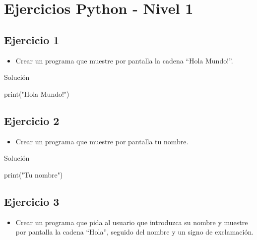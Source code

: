 \documentclass[
  a4paper,
  DIV=11,
  numbers=noendperiod,
  onepage,
  openany]{scrreprt}
\newenvironment{Shaded}{\begin{snugshade}}{\end{snugshade}}
\newcommand{\BuiltInTok}[1]{\textcolor[rgb]{0.00,0.23,0.31}{#1}}
\newcommand{\NormalTok}[1]{\textcolor[rgb]{0.00,0.23,0.31}{#1}}
\newcommand{\StringTok}[1]{\textcolor[rgb]{0.13,0.47,0.30}{#1}}
\providecommand{\tightlist}{%
  \setlength{\itemsep}{0pt}\setlength{\parskip}{0pt}}\usepackage{longtable,booktabs,array}
\begin{document}
\chapter{Ejercicios Python - Nivel 1}\label{ejercicios-python---nivel-1}

\section{Ejercicio 1}\label{ejercicio-1-2}

\begin{itemize}
\tightlist
\item
  Crear un programa que muestre por pantalla la cadena ``Hola Mundo!''.
\end{itemize}

Solución

\begin{Shaded}
\begin{Highlighting}[]
\BuiltInTok{print}\NormalTok{(}\StringTok{"Hola Mundo!"}\NormalTok{)}
\end{Highlighting}
\end{Shaded}

\section{Ejercicio 2}\label{ejercicio-2-1}

\begin{itemize}
\tightlist
\item
  Crear un programa que muestre por pantalla tu nombre.
\end{itemize}

Solución

\begin{Shaded}
\begin{Highlighting}[]
\BuiltInTok{print}\NormalTok{(}\StringTok{"Tu nombre"}\NormalTok{)}
\end{Highlighting}
\end{Shaded}

\section{Ejercicio 3}\label{ejercicio-3-1}

\begin{itemize}
\tightlist
\item
  Crear un programa que pida al usuario que introduzca su nombre y
  muestre por pantalla la cadena ``Hola'', seguido del nombre y un signo
  de exclamación.
\end{itemize}
\end{document}
